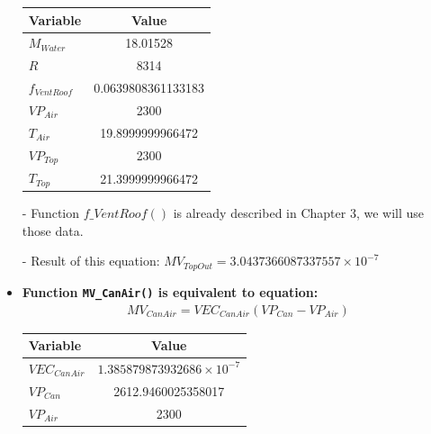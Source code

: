 \documentclass[a4paper]{article}
\numberwithin{equation}{section}
\begin{document}
\begin{itemize}
        \begin{table}[H]
          \centering
          \begin{tabular}{@{}lS[table-format=4.17]@{}}
            \toprule
            \textbf{Variable} & \textbf{Value}     \\
            \midrule
            \(M_{Water}\)     & 18.01528           \\
            \(R\)             & 8314               \\
            \(f_{VentRoof}\)  & 0.0639808361133183 \\
            \(VP_{Air}\)      & 2300               \\
            \(T_{Air}\)       & 19.8999999966472   \\
            \(VP_{Top}\)      & 2300               \\
            \(T_{Top}\)       & 21.3999999966472   \\
            \bottomrule
          \end{tabular}
        \end{table}
  \item [-] Function \hyperref[fVentRoof]{\underline{\(f\_VentRoof()\)}} is already described in Chapter 3, we will use those data.
  \item[-] Result of this equation: \(MV_{TopOut} = 3.0437366087337557 \times 10^{-7} \)

  \item \textbf{Function \texttt{MV\_CanAir()} is equivalent to equation:}
        \begin{align*}
          MV_{CanAir} = VEC_{CanAir}(VP_{Can} - VP_{Air})
        \end{align*}

        \begin{table}[H]
          \centering
          \begin{tabular}{@{}lS[table-format=4.20]@{}}
            \toprule
            \textbf{Variable} & \textbf{Value}                       \\
            \midrule
            \(VEC_{CanAir}\)  & \(1.385879873932686 \times 10^{-7}\) \\
            \(VP_{Can}\)      & 2612.9460025358017                   \\
            \(VP_{Air}\)      & 2300                                 \\
            \bottomrule
          \end{tabular}
        \end{table}


\end{itemize}
\end{document}
